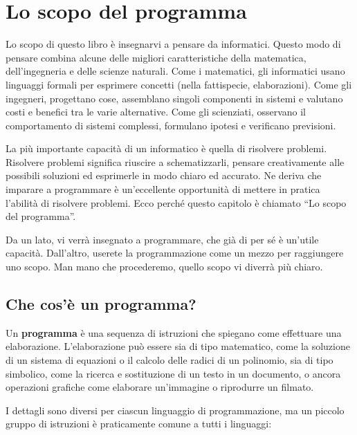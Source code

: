 \documentclass[10pt]{book}
\begin{document}
\mainmatter

\chapter{Lo scopo del programma}

Lo scopo di questo libro è insegnarvi a pensare da informatici. Questo modo di pensare combina alcune delle migliori caratteristiche della matematica, dell'ingegneria e delle scienze naturali. Come i matematici, gli informatici usano linguaggi formali per esprimere concetti (nella fattispecie, elaborazioni). Come gli ingegneri, progettano cose, assemblano singoli componenti in sistemi e valutano costi e benefici tra le varie alternative. Come gli scienziati, osservano il comportamento di sistemi complessi, formulano ipotesi e verificano previsioni.

La più importante capacità di un informatico è quella di risolvere problemi. Risolvere problemi significa riuscire a schematizzarli, pensare creativamente alle possibili soluzioni ed esprimerle in modo chiaro ed accurato. Ne deriva che imparare a programmare è un'eccellente opportunità di mettere in pratica l'abilità di risolvere problemi. Ecco perché questo capitolo è chiamato ``Lo scopo del programma''.

Da un lato, vi verrà insegnato a programmare, che già di per sé è un'utile   capacità. Dall'altro, userete la programmazione come un mezzo per raggiungere   uno scopo. Man mano che procederemo, quello scopo vi diverrà più chiaro.


\section{Che cos'è un programma?}

Un {\bf programma} è una sequenza di istruzioni che spiegano come effettuare una elaborazione. L'elaborazione può essere sia di tipo matematico, come la soluzione di un sistema di equazioni o il calcolo delle radici di un polinomio, sia di tipo simbolico, come la ricerca e sostituzione di un testo in un documento, o ancora operazioni grafiche come elaborare un'immagine o riprodurre un filmato.

I dettagli sono diversi per ciascun linguaggio di programmazione, ma un piccolo gruppo di istruzioni è praticamente comune a tutti i linguaggi:
\end{document}
